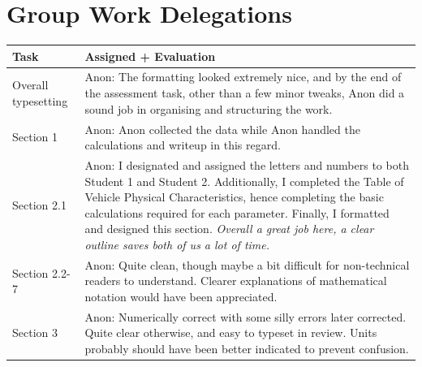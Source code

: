 \documentclass[../main.tex]{subfiles}
\begin{document}
\section{Group Work Delegations}
\begin{table}[h!]
	\begin{tabularx} {\textwidth} {
			| >{\centering\arraybackslash}X
			| >{\centering\arraybackslash}X |
		}
		\hline
		\textbf{Task}       & \textbf{Assigned + Evaluation}                                                                                                                                                                                                                                                                                                                                            \\
		\hline\hline
		Overall typesetting & Anon: The formatting looked extremely nice, and by the end of the assessment task, other than a few minor tweaks, Anon did a sound job in organising and structuring the work.                                                                                                                                                                                            \\
		\hline
		Section 1           & Anon: Anon collected the data while Anon handled the calculations and writeup in this regard.                                                                                                                                                                                                                                                                             \\
		\hline
		Section 2.1         & Anon: I designated and assigned the letters and numbers to both Student 1 and Student 2. Additionally, I completed the Table of Vehicle Physical Characteristics, hence completing the basic calculations required for each parameter. Finally, I formatted and designed this section. \textit{Overall a great job here, a clear outline saves both of us a lot of time.} \\
		\hline
		Section 2.2-7       & Anon: Quite clean, though maybe a bit difficult for non-technical readers to understand. Clearer explanations of mathematical notation would have been appreciated.                                                                                                                                                                                                       \\
		\hline
		Section 3           & Anon: Numerically correct with some silly errors later corrected. Quite clear otherwise, and easy to typeset in review. Units probably should have been better indicated to prevent confusion.                                                                                                                                                                            \\
		\hline
	\end{tabularx}
\end{table}
\end{document}
